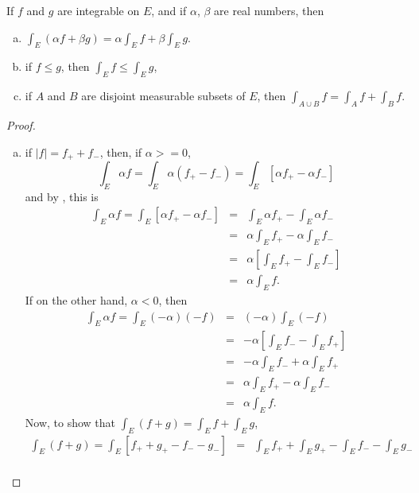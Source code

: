 \begin{pblm}\label{p:conditionsmeasu}%
	If $f$ and $g$ are integrable on $E$, and if $\alpha$, $\beta$ are real 
	numbers, then 
	\begin{enumerate}[(a)]
	\item $\int_E(\alpha f + \beta g) = \alpha \int_Ef + \beta\int_Eg$. 
	\item if $f \le g$, then $\int_Ef \le \int_Eg$, 
	\item if $A$ and $B$ are disjoint measurable subsets of $E$, then 
	$\int_{A\cup B}f = \int_Af + \int_Bf$. 
	\end{enumerate}
\begin{proof} ~
	\begin{enumerate}[(a)]
	\item if $|f|=f_++f_-$, then, if $\alpha >= 0$,
	\begin{equation*}
		\int_E\alpha f = \int_E\alpha(f_+-f_-) = \int_E[\alpha f_+ - \alpha f_-] 
	\end{equation*}
	and by , this is 
	\begin{equation*}
	\begin{array}{rcl}
		\int_E\alpha f = \int_E[\alpha f_+ - \alpha f_-] & = & \int_E\alpha f_+ - \int_E \alpha f_- \\
			& = & \alpha\int_E f_+ - \alpha\int_E f_- \\ 
			& = & \alpha\left[\int_Ef_+ - \int_Ef_-\right]\\
			& = & \alpha\int_Ef. 
	\end{array}
	\end{equation*}
	If on the other hand, $\alpha < 0$, then 
	\begin{equation*}
	\begin{array}{rcl}
		\int_E \alpha f = \int_E (-\alpha) (-f) & = & (-\alpha) \int_E (-f) \\
			& = & -\alpha \left[\int_E f_- - \int_E f_+\right]\\
			& = & -\alpha \int_E f_- + \alpha \int_E f_+\\
			& = & \alpha \int_E f_+ - \alpha \int_E f_-\\
			& = & \alpha \int_E f. 
	\end{array}
	\end{equation*}
	Now, to show that $\int_E(f+g) = \int_Ef+\int_Eg$, 
	\begin{equation*}
	\begin{array}{rcl}
		\int_E(f+g) = \int_E[f_++g_+-f_--g_-] &=& \int_Ef_++\int_Eg_+-\int_Ef_--\int_Eg_- \\ 	

\end{array}
\end{equation*}
\end{enumerate}
\end{proof}
\end{pblm}
